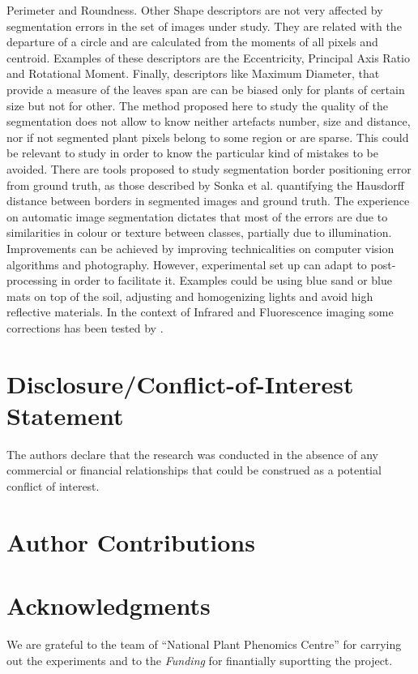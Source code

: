 \documentclass{frontiersSCNS} %
\begin{document}
Perimeter and Roundness.
Other Shape descriptors are not very affected by segmentation errors in the set of images under study. They are related with the departure of a circle and are calculated from the moments of all pixels and centroid. Examples of these descriptors are the Eccentricity, Principal Axis Ratio and Rotational Moment.
Finally, descriptors like Maximum Diameter, that provide a measure of the leaves span are can be biased only for plants of certain size but not for other.
The method proposed here to study the quality of the segmentation does not allow to know neither artefacts number, size and distance, nor if not segmented plant pixels belong to some region or are sparse. This could be relevant to study in order to know the particular kind of mistakes to be avoided. There are tools proposed to study segmentation border positioning error from ground truth, as those described by Sonka et al. quantifying the Hausdorff distance between borders in segmented images and ground truth.
The experience on automatic image segmentation dictates that most of the errors are due to similarities in colour or texture between classes, partially due to illumination. Improvements can be achieved by improving technicalities on computer vision algorithms and photography. However, experimental set up can adapt to post-processing in order to facilitate it. Examples could be using blue sand or blue mats on top of the soil, adjusting and homogenizing lights and avoid high reflective materials. In the context of Infrared and Fluorescence imaging some corrections has been tested by \cite{fpls.2014.00770}.


\section*{Disclosure/Conflict-of-Interest Statement}


The authors declare that the research was conducted in the absence of any commercial or financial relationships that could be construed as a potential conflict of interest.

\section*{Author Contributions}



\section*{Acknowledgments}
 We are grateful to the team of “National Plant Phenomics Centre” for carrying out the experiments and to the 
\textit{Funding\textcolon} for finantially suportting the project.
\end{document}
